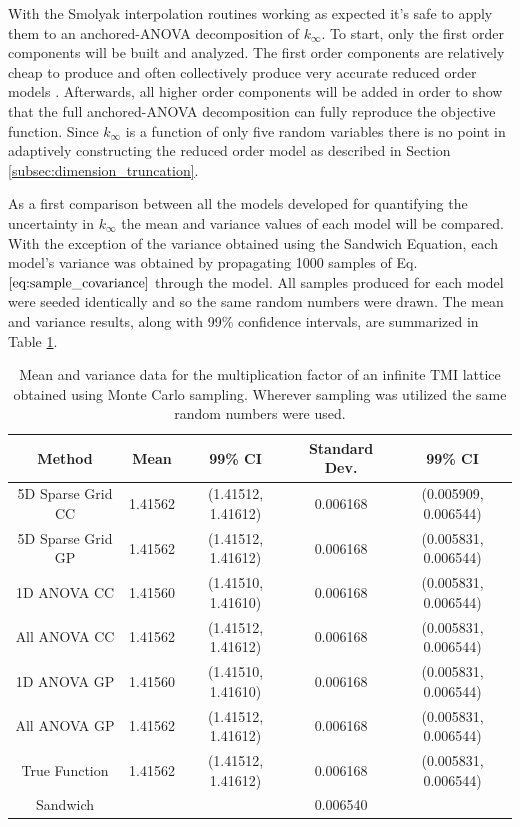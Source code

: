 With the Smolyak interpolation routines working as expected it's safe to apply them to an anchored-\ac{ANOVA} decomposition of $k_{\infty}$. To start, only the first order components will be built and analyzed. The first order components are relatively cheap to produce and often collectively produce very accurate reduced order models \cite{AHSGC_HighDimensions}. Afterwards, all higher order components will be added in order to show that the full anchored-\ac{ANOVA} decomposition can fully reproduce the objective function. Since $k_{\infty}$ is a function of only five random variables there is no point in adaptively constructing the reduced order model as described in Section \ref{subsec:dimension_truncation}.        

As a first comparison between all the models developed for quantifying the uncertainty in $k_{\infty}$ the mean and variance values of each model will be compared. With the exception of the variance obtained using the Sandwich Equation, each model's variance was obtained by propagating 1000 samples of Eq. $\ref{eq:sample_covariance}$ through the model. All samples produced for each model were seeded identically and so the same random numbers were drawn. The mean and variance results, along with 99\% confidence intervals, are summarized in Table \ref{table:kinf_mean_variance}. 
    
\begin{table} 
\caption[Mean and variance for TMI infinite multiplication factor.]{\label{table:kinf_mean_variance} 
Mean and variance data for the multiplication factor of an infinite TMI lattice obtained using Monte Carlo sampling. Wherever sampling was utilized the same random numbers were used.}
\centering
\small
\begin{tabular}{||c|c|c|c|c||} 
\hline \hline
\textbf{Method} & \textbf{Mean} & \textbf{99\% CI} & \textbf{Standard Dev.} & \textbf{99\% CI} \\ \hline
5D Sparse Grid CC      & 1.41562 & (1.41512, 1.41612) & 0.006168 & (0.005909, 0.006544) \\ \hline
5D Sparse Grid GP      & 1.41562 & (1.41512, 1.41612) & 0.006168 & (0.005831, 0.006544) \\ \hline
1D ANOVA CC  & 1.41560 & (1.41510, 1.41610) & 0.006168 & (0.005831, 0.006544) \\ \hline
All ANOVA CC & 1.41562 & (1.41512, 1.41612) & 0.006168 & (0.005831, 0.006544) \\ \hline
1D ANOVA GP  & 1.41560 & (1.41510, 1.41610) & 0.006168 & (0.005831, 0.006544) \\ \hline
All ANOVA GP & 1.41562 & (1.41512, 1.41612) & 0.006168 & (0.005831, 0.006544) \\ \hline
True Function & 1.41562 & (1.41512, 1.41612) & 0.006168 & (0.005831, 0.006544) \\ \hline
Sandwich               &         &                    & 0.006540 &                      \\
\hline \hline
\end{tabular}
\end{table}

